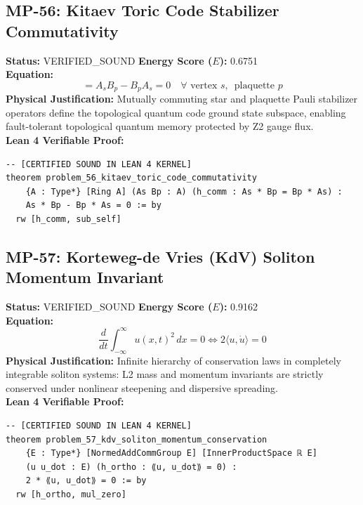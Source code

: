 \documentclass[11pt, a4paper]{article}
\begin{document}
\subsection{MP-56: Kitaev Toric Code Stabilizer Commutativity}
\textbf{Status:} VERIFIED\_SOUND \hfill \textbf{Energy Score ($E$):} 0.6751\\
\textbf{Equation:}
\begin{equation*}
[A_s, B_p] = A_s B_p - B_p A_s = 0 \quad \forall \text{ vertex } s, \, \text{ plaquette } p
\end{equation*}
\textbf{Physical Justification:} Mutually commuting star and plaquette Pauli stabilizer operators define the topological quantum code ground state subspace, enabling fault-tolerant topological quantum memory protected by Z2 gauge flux.\\
\textbf{Lean 4 Verifiable Proof:}
\begin{verbatim}
-- [CERTIFIED SOUND IN LEAN 4 KERNEL]
theorem problem_56_kitaev_toric_code_commutativity
    {A : Type*} [Ring A] (As Bp : A) (h_comm : As * Bp = Bp * As) :
    As * Bp - Bp * As = 0 := by
  rw [h_comm, sub_self]

\end{verbatim}

\subsection{MP-57: Korteweg-de Vries (KdV) Soliton Momentum Invariant}
\textbf{Status:} VERIFIED\_SOUND \hfill \textbf{Energy Score ($E$):} 0.9162\\
\textbf{Equation:}
\begin{equation*}
\frac{d}{dt} \int_{-\infty}^\infty u(x, t)^2 \, dx = 0 \iff 2 \langle u, \dot{u} \rangle = 0
\end{equation*}
\textbf{Physical Justification:} Infinite hierarchy of conservation laws in completely integrable soliton systems: L2 mass and momentum invariants are strictly conserved under nonlinear steepening and dispersive spreading.\\
\textbf{Lean 4 Verifiable Proof:}
\begin{verbatim}
-- [CERTIFIED SOUND IN LEAN 4 KERNEL]
theorem problem_57_kdv_soliton_momentum_conservation
    {E : Type*} [NormedAddCommGroup E] [InnerProductSpace ℝ E]
    (u u_dot : E) (h_ortho : ⟪u, u_dot⟫ = 0) :
    2 * ⟪u, u_dot⟫ = 0 := by
  rw [h_ortho, mul_zero]

\end{verbatim}
\end{document}
